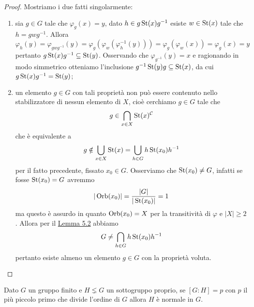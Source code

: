 \documentclass[11pt]{scrartcl}
\begin{document}
\begin{proof}
    Mostriamo i due fatti singolarmente:
    \begin{enumerate}[(1)]
        \item sia $g \in G$ tale che $\varphi_g(x) = y$, dato 
        $h \in g\operatorname{St}(x)g^{-1}$ esiste $w \in \operatorname{St}(x)$ tale che $h = gwg^{-1}$. 
        Allora
        \[
            \varphi_h(y) = \varphi_{gwg^{-1}}(y) = 
            \varphi_g(\varphi_w(\varphi_h^{-1}(y))) = \varphi_g(\varphi_w(x)) =
            \varphi_g(x) = y
        \]pertanto $g\operatorname{St}(x)g^{-1} \subseteq \operatorname{St}(y)$. Osservando che 
        $\varphi_{g^{-1}}(y) = x$ e ragionando in modo simmetrico otteniamo
        l'inclusione $g^{-1}\operatorname{St}(y)g \subseteq \operatorname{St}(x)$, da cui $g\operatorname{St}(x)g^{-1} = \operatorname{St}(y)$;
        \item un elemento $g \in G$ con tali proprietà non può essere contenuto 
        nello stabilizzatore di nessun elemento di $X$, cioè cerchiamo $g \in G$
        tale che
        \[
            g \in \bigcap_{x \in X}\operatorname{St}(x)^{\mathcal{C}}
        \]
        che è equivalente a
        \[
            g \notin \bigcup_{x \in X} \operatorname{St}(x) = \bigcup_{h \in G}h\operatorname{St}(x_0)h^{-1}
        \]per il fatto precedente, fissato $x_0 \in G$. Osserviamo che 
        $\operatorname{St}(x_0) \neq G$, infatti se fosse $\operatorname{St}(x_0) = G$ avremmo 
        \[
            |\operatorname{Orb}(x_0)| = \frac{|G|}{|\operatorname{St}(x_0)|} = 1
        \]ma questo è assurdo in quanto $\operatorname{Orb}(x_0) = X$ per la transitività di 
        $\varphi$ e $|X|\geqslant 2$. Allora per il \hyperref[lemma2.0]{Lemma 5.2}
        abbiamo 
        \[
            G \neq \bigcap_{h \in G}h\operatorname{St}(x_0)h^{-1}
        \]pertanto esiste almeno un elemento $g\in G$ con la proprietà voluta.
    \end{enumerate}
\end{proof}

\begin{proposition}
    Dato $G$ un gruppo finito e $H \lneq G$ un sottogruppo proprio, se $[G:H] = p$
    con $p$ il più piccolo primo che divide l'ordine di $G$ allora $H$ è normale
    in $G$.
\end{proposition}
\end{document}
